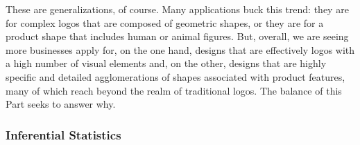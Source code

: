 \documentclass[letterpaper, 11pt, oneside]{article}
\begin{document}
These are generalizations, of course. Many applications buck this trend: they are for complex logos that are composed of geometric shapes, or they are for a product shape that includes human or animal figures. But, overall, we are seeing more businesses apply for, on the one hand, designs that are effectively logos with a high number of visual elements and, on the other, designs that are highly specific and detailed agglomerations of shapes associated with product features, many of which reach beyond the realm of traditional logos. The balance of this Part seeks to answer why.

\subsubsection{Inferential Statistics}\label{subsubsec:2B2}
\end{document}
